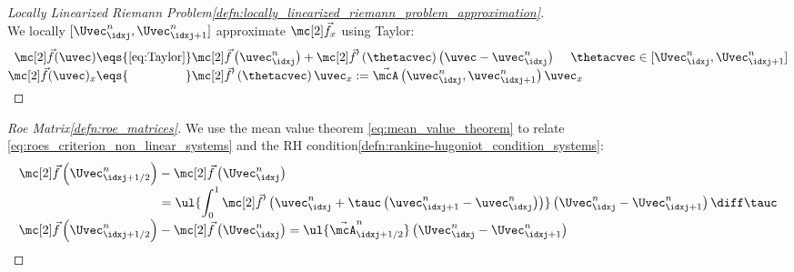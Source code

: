 \begin{proofbox}\nospacing
    \begin{proof}[Locally Linearized Riemann Problem\cref{defn:locally_linearized_riemann_problem_approximation}]\label{proof:defn:locally_linearized_riemann_problem_approximation}\leavevmode\\
        We locally $[\Uvec_{\idxj}^{n},\Uvec_{\idxj+1}^{n}]$ approximate $\fluxvec_{x}$ using Taylor:
        \begin{align*}
          \fluxvec(\uvec)\eqs{\cref{eq:Taylor}}&\fluxvec \left(\uvec_{\idxj}^{n}\right)+\fluxvec' \left(\thetacvec\right)\left(\uvec-\uvec_{\idxj}^{n}\right)&&\hspace{-2em}\thetacvec\in[\Uvec_{\idxj}^{n},\Uvec_{\idxj+1}^{n}]\\[-1\jot]
          \fluxvec(\uvec)_{x}\eqs{\hphantom{\cref{eq:Taylor}}}&\fluxvec'\left(\thetacvec\right)\uvec_{x}:=\linfluxvec\left(\uvec_{\idxj}^{n},\uvec_{\idxj+1}^{n}\right)\uvec_{x}\\[-1\jot]
        \end{align*}
    \end{proof}
\end{proofbox}
\begin{proofbox}\nospacing
    \begin{proof}[Roe Matrix\cref{defn:roe_matrices}]\label{proof:defn:roe_matrices}
        We use the mean value theorem \cref{eq:mean_value_theorem} to relate \cref{eq:roes_criterion_non_linear_systems} and
        the RH condition\cref{defn:rankine-hugoniot_condition_systems}:
        \begin{align*}
          \fluxvec\left(\Uvec_{\idxj+1/2}^{n}\right)&-\fluxvec\left(\Uvec_{\idxj}^{n}\right)\\[-1\jot]
          &=\ul{\int_{0}^{1}\fluxvec' \left(\uvec_{\idxj}^{n}+\tauc \left(\uvec_{\idxj+1}^{n}-\uvec_{\idxj}^{n}\right)\right)}\left(\Uvec_{\idxj}^{n}-\Uvec_{\idxj+1}^{n}\right)\diff\tauc \\[-1\jot]
          \fluxvec\left(\Uvec_{\idxj+1/2}^{n}\right)&-\fluxvec\left(\Uvec_{\idxj}^{n}\right)=\ul{\linfluxvec_{\idxj+1/2}^{n}}\left(\Uvec_{\idxj}^{n}-\Uvec_{\idxj+1}^{n}\right)
        \end{align*}
    \end{proof}
\end{proofbox}
